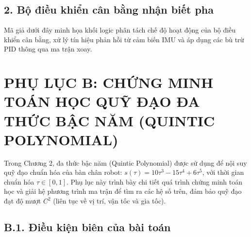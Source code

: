 \vspace{0.5cm}

\section*{2. Bộ điều khiển cân bằng nhận biết pha}

Mã giả dưới đây minh họa khối logic phân tách chế độ hoạt động của bộ điều khiển cân bằng, xử lý tín hiệu phản hồi từ cảm biến IMU và áp dụng các bù trừ PID thông qua ma trận xoay.

\begin{algorithm}[H]
\caption{Phase-Aware PID Balance Controller}
\SetAlgoLined
{}
\end{algorithm}

\vspace{1cm}

\chapter*{PHỤ LỤC B: CHỨNG MINH TOÁN HỌC QUỸ ĐẠO ĐA THỨC BẬC NĂM (QUINTIC POLYNOMIAL)}

Trong Chương 2, đa thức bậc năm (Quintic Polynomial) được sử dụng để nội suy quỹ đạo chuẩn hóa của bàn chân robot: $s(\tau) = 10\tau^3 - 15\tau^4 + 6\tau^5$, với thời gian chuẩn hóa $\tau \in [0, 1]$. Phụ lục này trình bày chi tiết quá trình chứng minh toán học và giải hệ phương trình ma trận để tìm ra các hệ số trên, đảm bảo quỹ đạo đạt độ mượt $C^2$ (liên tục về vị trí, vận tốc và gia tốc).

\section*{B.1. Điều kiện biên của bài toán}

